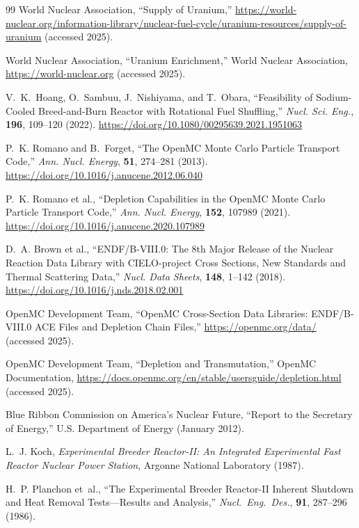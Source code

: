 \documentclass[10pt,twoside]{article}
\begin{document}
\begin{thebibliography}{99}
World Nuclear Association,
``Supply of Uranium,''
\url{https://world-nuclear.org/information-library/nuclear-fuel-cycle/uranium-resources/supply-of-uranium}
(accessed 2025).

World Nuclear Association,
``Uranium Enrichment,''
World Nuclear Association,
\url{https://world-nuclear.org} (accessed 2025).

V.~K.~Hoang, O.~Sambuu, J.~Nishiyama, and T.~Obara,
``Feasibility of Sodium-Cooled Breed-and-Burn Reactor with Rotational
Fuel Shuffling,''
\textit{Nucl. Sci. Eng.}, \textbf{196}, 109--120 (2022).
\url{https://doi.org/10.1080/00295639.2021.1951063}

P.~K. Romano and B.~Forget,
``The OpenMC Monte Carlo Particle Transport Code,''
\textit{Ann. Nucl. Energy}, \textbf{51}, 274--281 (2013).
\url{https://doi.org/10.1016/j.anucene.2012.06.040}

P.~K. Romano et al.,
``Depletion Capabilities in the OpenMC Monte Carlo Particle Transport Code,''
\textit{Ann. Nucl. Energy}, \textbf{152}, 107989 (2021).
\url{https://doi.org/10.1016/j.anucene.2020.107989}

D.~A. Brown et al.,
``ENDF/B-VIII.0: The 8th Major Release of the Nuclear Reaction Data Library
with CIELO-project Cross Sections, New Standards and Thermal Scattering Data,''
\textit{Nucl. Data Sheets}, \textbf{148}, 1--142 (2018).
\url{https://doi.org/10.1016/j.nds.2018.02.001}

OpenMC Development Team,
``OpenMC Cross-Section Data Libraries: ENDF/B-VIII.0 ACE Files and
Depletion Chain Files,''
\url{https://openmc.org/data/} (accessed 2025).

OpenMC Development Team,
``Depletion and Transmutation,'' OpenMC Documentation,
\url{https://docs.openmc.org/en/stable/usersguide/depletion.html}
(accessed 2025).

Blue Ribbon Commission on America's Nuclear Future,
``Report to the Secretary of Energy,''
U.S. Department of Energy (January 2012).

L.~J. Koch,
\textit{Experimental Breeder Reactor-II: An Integrated Experimental
Fast Reactor Nuclear Power Station},
Argonne National Laboratory (1987).

H.~P. Planchon et~al.,
``The Experimental Breeder Reactor-II Inherent Shutdown and Heat
Removal Tests---Results and Analysis,''
\textit{Nucl.\ Eng.\ Des.}, \textbf{91}, 287--296 (1986).


\end{thebibliography}
\end{document}
